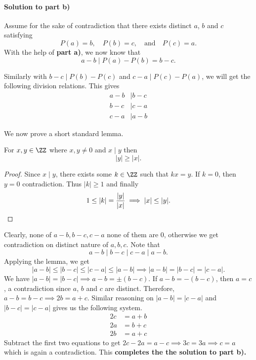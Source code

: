 \documentclass[numbers=endperiod, 11pt]{scrartcl}
\begin{document}
\begin{sol}
    \paragraph{Solution to part b)} Assume for the sake
    of contradiction that there exists distinct $a$, $b$
    and $c$ satisfying
    \[P(a) = b, \quad P(b) = c, \quad \text{and} \quad P(c) = a.\]
    With the help of \textbf{part a)}, we now know that
    \[ a - b \mid P(a) - P(b) = b - c. \]

    Similarly with $b - c \mid P(b) - P(c)$ and
    $c - a \mid P(c) - P(a)$, we will get the following
    division relations. This gives
    \begin{align*}
        a - b & \mid b - c \\
        b - c & \mid c - a \\
        c - a & \mid a - b
    \end{align*}

    We now prove a short standard lemma.
    \begin{lemma*}
        For $x,y \in \ZZ$ where $x,y \ne 0$ and $x \mid y$
        then
        \[ |y| \ge |x|. \]
    \end{lemma*}
    \begin{proof}
        Since $x \mid y$, there exists some $k \in \ZZ$ such
        that $kx = y$. If $k = 0$, then $y = 0$
        contradiction. Thus $|k| \ge 1$ and finally
        \[1 \le |k| = \frac{|y|}{|x|} \implies |x| \le |y|. \qedhere\]
    \end{proof}

    Clearly, none of $a-b, b-c, c-a$ none of them are
    $0$, otherwise we get contradiction on distinct nature
    of $a,b,c$. Note that
    \[ a - b \mid b-c \mid c-a \mid a-b. \]
    Applying the lemma, we get
    \[ |a-b| \le |b-c| \le |c-a| \le |a-b| \implies |a-b| = |b-c| = |c-a|.\]
    We have $|a-b| = |b-c| \implies a-b = \pm (b-c)$.
    If $a-b = -(b-c)$, then $a = c$, a contradiction since
    $a$, $b$ and $c$ are distinct. Therefore,
    $a-b = b-c \implies 2b = a + c$. Similar reasoning
    on $|a - b| = |c - a|$ and $|b-c| = |c-a|$ gives
    us the following system.
    \begin{align*}
        2c & = a + b \\
        2a & = b + c \\
        2b & = a + c
    \end{align*}
    Subtract the first two equations to get
    $2c - 2a = a - c \implies 3c = 3a \implies c = a$ which
    is again a contradiction. This
    \textbf{completes the the solution to part b).}
\end{sol}
\newpage
\end{document}
